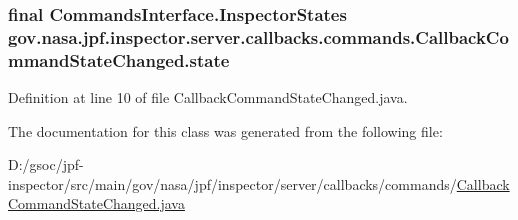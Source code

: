 \subsubsection[{\texorpdfstring{state}{state}}]{\setlength{\rightskip}{0pt plus 5cm}final Commands\+Interface.\+Inspector\+States gov.\+nasa.\+jpf.\+inspector.\+server.\+callbacks.\+commands.\+Callback\+Command\+State\+Changed.\+state\hspace{0.3cm}{\ttfamily [private]}}\hypertarget{classgov_1_1nasa_1_1jpf_1_1inspector_1_1server_1_1callbacks_1_1commands_1_1_callback_command_state_changed_af2e5e8e2807deb2d791faa4ae388ae5c}{}\label{classgov_1_1nasa_1_1jpf_1_1inspector_1_1server_1_1callbacks_1_1commands_1_1_callback_command_state_changed_af2e5e8e2807deb2d791faa4ae388ae5c}


Definition at line 10 of file Callback\+Command\+State\+Changed.\+java.



The documentation for this class was generated from the following file\+:\begin{DoxyCompactItemize}
\item 
D\+:/gsoc/jpf-\/inspector/src/main/gov/nasa/jpf/inspector/server/callbacks/commands/\hyperlink{_callback_command_state_changed_8java}{Callback\+Command\+State\+Changed.\+java}\end{DoxyCompactItemize}
